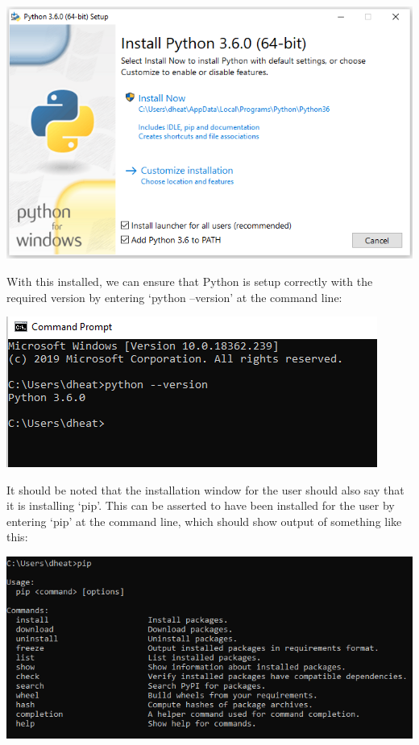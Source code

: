 \documentclass[12pt,twoside]{report}
\begin{document}
\begin{center}
\includegraphics[scale=0.8]{project_figures/fig5_1}
\end{center}

\quad With this installed, we can ensure that Python is setup correctly with the required version by entering ‘python --version’ at the command line:

\begin{center}
\includegraphics[scale=0.8]{project_figures/fig5_2}
\end{center}

\quad It should be noted that the installation window for the user should also say that it is installing ‘pip’. This can be asserted to have been installed for the user by entering ‘pip’ at the command line, which should show output of something like this:

\begin{center}
\includegraphics[scale=0.8]{project_figures/fig5_3}
\end{center}
\end{document}
